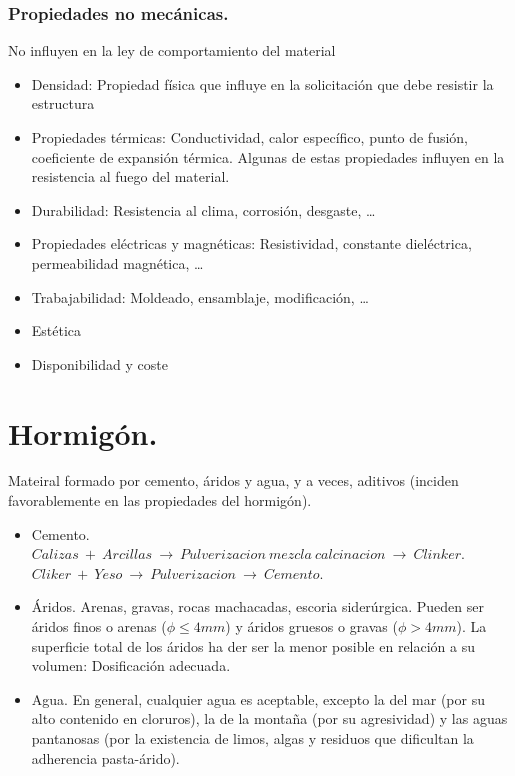 \subsubsection{Propiedades no mecánicas.}
No influyen en la ley de comportamiento del material
\begin{itemize}
    \item Densidad: Propiedad física que influye en la solicitación que debe resistir la estructura
    \item Propiedades térmicas: Conductividad, calor específico, punto de fusión, coeficiente de expansión térmica. Algunas de estas propiedades influyen en la resistencia al fuego del material.
    \item Durabilidad: Resistencia al clima, corrosión, desgaste, \dots
    \item Propiedades eléctricas y magnéticas: Resistividad, constante dieléctrica, permeabilidad magnética, \dots
    \item Trabajabilidad: Moldeado, ensamblaje, modificación, \dots
    \item Estética
    \item Disponibilidad y coste
\end{itemize}


\section{Hormigón.}
Mateiral formado por cemento, áridos y agua, y a veces, aditivos (inciden favorablemente en las propiedades del hormigón).

\begin{itemize}
    \item Cemento. $Calizas\ +\ Arcillas\ \rightarrow\ Pulverizacion\ mezcla\ calcinacion\ \rightarrow\ Clinker$. $Cliker\ +\ Yeso\  \rightarrow\ Pulverizacion\ \rightarrow\ Cemento$.
    \item Áridos. Arenas, gravas, rocas machacadas, escoria siderúrgica. Pueden ser áridos finos o arenas ($\phi \leq 4 mm$) y áridos gruesos o gravas ($\phi > 4mm$). La superficie total de los áridos ha der ser la menor posible en relación a su volumen: Dosificación adecuada.
    \item Agua. En general, cualquier agua es aceptable, excepto la del mar (por su alto contenido en cloruros), la de la montaña (por su agresividad) y las aguas pantanosas (por la existencia de limos, algas y residuos que dificultan la adherencia pasta-árido).
\end{itemize}


